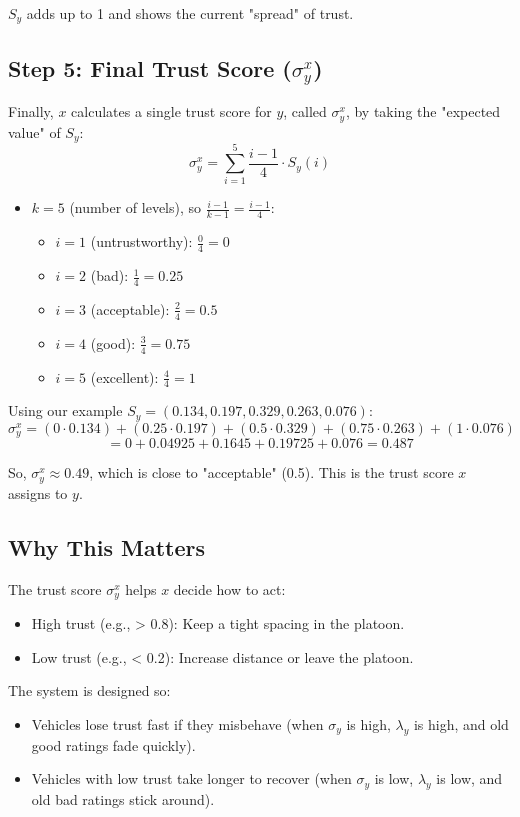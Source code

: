 \documentclass{article}
\begin{document}
\(S_y\) adds up to 1 and shows the current "spread" of trust.

\subsection*{Step 5: Final Trust Score (\(\sigma_y^x\))}
Finally, \(x\) calculates a single trust score for \(y\), called \(\sigma_y^x\), by taking the "expected value" of \(S_y\):
\[
\sigma_y^x = \sum_{i=1}^5 \frac{i-1}{4} \cdot S_y(i)
\]
\begin{itemize}
    \item \(k = 5\) (number of levels), so \(\frac{i-1}{k-1} = \frac{i-1}{4}\):
    \begin{itemize}
        \item \(i = 1\) (untrustworthy): \(\frac{0}{4} = 0\)
        \item \(i = 2\) (bad): \(\frac{1}{4} = 0.25\)
        \item \(i = 3\) (acceptable): \(\frac{2}{4} = 0.5\)
        \item \(i = 4\) (good): \(\frac{3}{4} = 0.75\)
        \item \(i = 5\) (excellent): \(\frac{4}{4} = 1\)
    \end{itemize}
\end{itemize}

Using our example \(S_y = (0.134, 0.197, 0.329, 0.263, 0.076)\):
\[
\sigma_y^x = (0 \cdot 0.134) + (0.25 \cdot 0.197) + (0.5 \cdot 0.329) + (0.75 \cdot 0.263) + (1 \cdot 0.076)
\]
\[
= 0 + 0.04925 + 0.1645 + 0.19725 + 0.076 = 0.487
\]

So, \(\sigma_y^x \approx 0.49\), which is close to "acceptable" (0.5). This is the trust score \(x\) assigns to \(y\).

\subsection*{Why This Matters}
The trust score \(\sigma_y^x\) helps \(x\) decide how to act:
\begin{itemize}
    \item High trust (e.g., > 0.8): Keep a tight spacing in the platoon.
    \item Low trust (e.g., < 0.2): Increase distance or leave the platoon.
\end{itemize}

The system is designed so:
\begin{itemize}
    \item Vehicles lose trust fast if they misbehave (when \(\sigma_y\) is high, \(\lambda_y\) is high, and old good ratings fade quickly).
    \item Vehicles with low trust take longer to recover (when \(\sigma_y\) is low, \(\lambda_y\) is low, and old bad ratings stick around).
\end{itemize}
\end{document}
